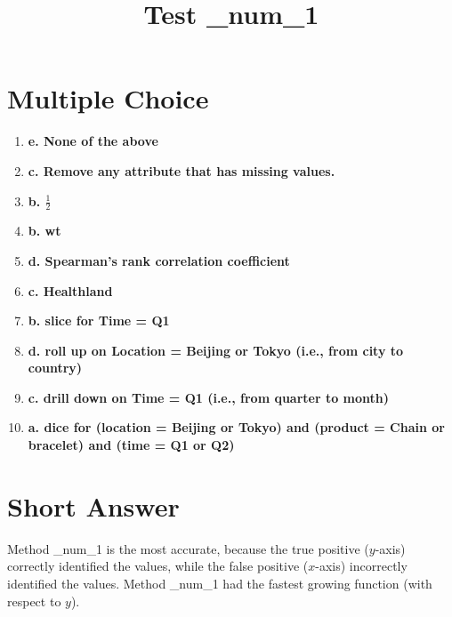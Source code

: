 \documentclass[12pt]{scrartcl}
\title{Test \_num_1}
\begin{document}
\maketitle

\section*{Multiple Choice}
\begin{enumerate}
    \item \textbf{e. None of the above}
    \item \textbf{c. Remove any attribute that has missing values.}
    \item \textbf{b. $\frac{1}{2}$}
    \item \textbf{b. wt}
    \item \textbf{d. Spearman’s rank correlation coefficient}
    \item \textbf{c. Healthland}
    \item \textbf{b. slice for Time = Q1}
    \item \textbf{d. roll up on Location = Beijing or Tokyo  (i.e., from city to country)}
    \item \textbf{c. drill down on Time = Q1  (i.e., from quarter to month)}
    \item \textbf{a. dice for (location = Beijing or Tokyo) and (product = Chain or bracelet) and (time = Q1 or Q2)}
\end{enumerate}

\setcounter{section}{10}
\section{Short Answer}
Method \_num_1 is the most accurate, because the true positive ($y$-axis) correctly identified the values, while the false positive ($x$-axis) incorrectly identified the values. Method \_num_1 had the fastest growing function (with respect to $y$).
\end{document}
